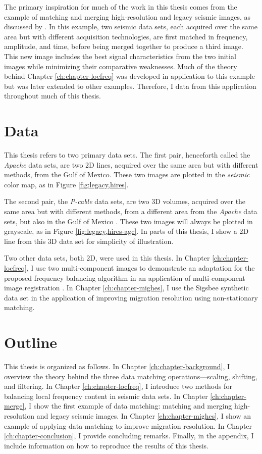 The primary inspiration for much of the work in this thesis comes from the example of matching and merging high-resolution and legacy seismic images, as discussed by \cite{merge2, merge}.
In this example, two seismic data sets, each acquired over the same area but with different acquisition technologies, are first matched in frequency, amplitude, and time, before being merged together to produce a third image.
This new image includes the best signal characteristics from the two initial images while minimizing their comparative weaknesses.
Much of the theory behind Chapter \ref{ch:chapter-locfreq} was developed in application to this example but was later extended to other examples.
Therefore, I data from this application throughout much of this thesis.

\section{Data}
This thesis refers to two primary data sets. 
The first pair, henceforth called the {\it Apache} data sets, are two 2D lines, acquired over the same area but with different methods, from the Gulf of Mexico. 
These two images are plotted in the {\em seismic} color map, as in Figure \ref{fig:legacy,hires}.

The second pair, the {\em P-cable} data sets, are two 3D volumes, acquired over the same area but with different methods, from a different area from the {\em Apache} data sets, but also in the Gulf of Mexico \cite[]{pcable,data}.
These two images will always be plotted in grayscale, as in Figure \ref{fig:legacy,hires-agc}.
In parts of this thesis, I show a 2D line from this 3D data set for simplicity of illustration.

Two other data sets, both 2D, were used in this thesis. 
In Chapter \ref{ch:chapter-locfreq}, I use two multi-component images to demonstrate an adaptation for the proposed frequency balancing algorithm in an application of multi-component image registration \cite[]{attr}.
In Chapter \ref{ch:chapter-mighes}, I use the Sigsbee synthetic data set \cite[]{sigsbee} in the application of improving migration resolution using non-stationary matching.

\section{Outline}
This thesis is organized as follows.
In Chapter \ref{ch:chapter-background}, I overview the theory behind the three data matching operations---scaling, shifting, and filtering.
In Chapter \ref{ch:chapter-locfreq}, I introduce two methods for balancing local frequency content in seismic data sets.
In Chapter \ref{ch:chapter-merge}, I show the first example of data matching: matching and merging high-resolution and legacy seismic images.
In Chapter \ref{ch:chapter-mighes}, I show an example of applying data matching to improve migration resolution.
In Chapter \ref{ch:chapter-conclusion}, I provide concluding remarks.
Finally, in the appendix, I include information on how to reproduce the results of this thesis.

